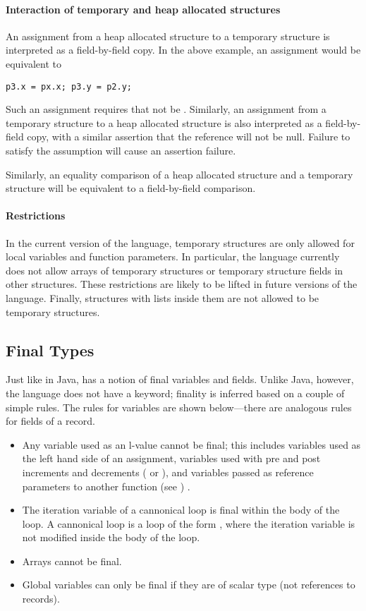 \paragraph{Interaction of temporary and heap allocated structures}
An assignment from a heap allocated structure to a temporary structure is interpreted as a field-by-field copy. In the above example, an assignment  would be equivalent to 
\begin{lstlisting}
p3.x = px.x; p3.y = p2.y;
\end{lstlisting}
Such an assignment requires that  not be . Similarly, an assignment from a temporary structure to a heap allocated structure is also interpreted as a field-by-field copy, with a similar assertion that the reference will not be null. Failure to satisfy the assumption will cause an assertion failure. 

Similarly, an equality comparison of a heap allocated structure and a temporary structure will be equivalent to a field-by-field comparison.

\paragraph{Restrictions}
In the current version of the language, temporary structures are only allowed for local variables and function parameters. In particular, the language currently does not allow arrays of temporary structures or temporary structure fields in other structures. These restrictions are likely to be lifted in future versions of the language. Finally, structures with lists inside them are not allowed to be temporary structures.




\subsection{Final Types}
Just like in Java, \Sk{} has a notion of final variables and fields. Unlike Java, however, the language does not have a  keyword; finality is inferred based on a couple of simple rules. The rules for variables are shown below---there are analogous rules for fields of a record. 

\begin{itemize}
\item Any variable used as an l-value cannot be final; this includes variables used as the left hand side of an assignment, variables used with pre and post increments and decrements ( or ), and variables passed as reference parameters to another function (see ) .

\item The iteration variable of a cannonical  loop is final within the body of the loop. A cannonical  loop is a loop of the form , where the iteration variable is not modified inside the body of the loop. 

\item Arrays cannot be final. 
\item Global variables can only be final if they are of scalar type (not references to records).
\end{itemize}

